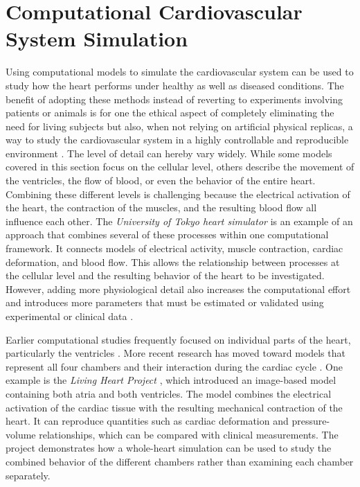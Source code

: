 \section{Computational Cardiovascular System Simulation}\label{sec:related_work_computational}
Using computational models to simulate the cardiovascular system can be used to study how the heart performs under healthy as well as diseased conditions. The benefit of adopting these methods instead of reverting to experiments involving patients or animals is for one the ethical aspect of completely eliminating the need for living subjects but also, when not relying on artificial physical replicas, a way to study the cardiovascular system in a highly controllable and reproducible environment \cite{passini2017human}. The level of detail can hereby vary widely. While some models covered in this section focus on the cellular level, others describe the movement of the ventricles, the flow of blood, or even the behavior of the entire heart. Combining these different levels is challenging because the electrical activation of the heart, the contraction of the muscles, and the resulting blood flow all influence each other. The \emph{University of Tokyo heart simulator} is an example of an approach that combines several of these processes within one computational framework. It connects models of electrical activity, muscle contraction, cardiac deformation, and blood flow. This allows the relationship between processes at the cellular level and the resulting behavior of the heart to be investigated. However, adding more physiological detail also increases the computational effort and introduces more parameters that must be estimated or validated using experimental or clinical data \cite{SUGIURA2012380}.

Earlier computational studies frequently focused on individual parts of the heart, particularly the ventricles \cite{BAILLARGEON201438}. More recent research has moved toward models that represent all four chambers and their interaction during the cardiac cycle \cite{FEDELE2023115983}. One example is the \emph{Living Heart Project} \cite{BAILLARGEON201438}, which introduced an image-based model containing both atria and both ventricles. The model combines the electrical activation of the cardiac tissue with the resulting mechanical contraction of the heart. It can reproduce quantities such as cardiac deformation and pressure-volume relationships, which can be compared with clinical measurements. The project demonstrates how a whole-heart simulation can be used to study the combined behavior of the different chambers rather than examining each chamber separately.

